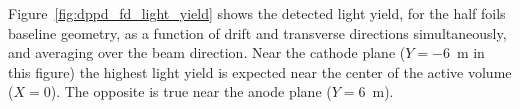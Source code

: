 Figure~\ref{fig:dppd_fd_light_yield} shows the detected light yield, for the half foils baseline geometry, as a function of drift and transverse directions simultaneously, and averaging over the beam direction. Near the cathode plane ($Y=$\SI{-6}{m} in this figure) the highest light yield is expected near the center of the active volume ($X=0$). The opposite is true near the anode plane ($Y=$\SI{+6}{m}).  

